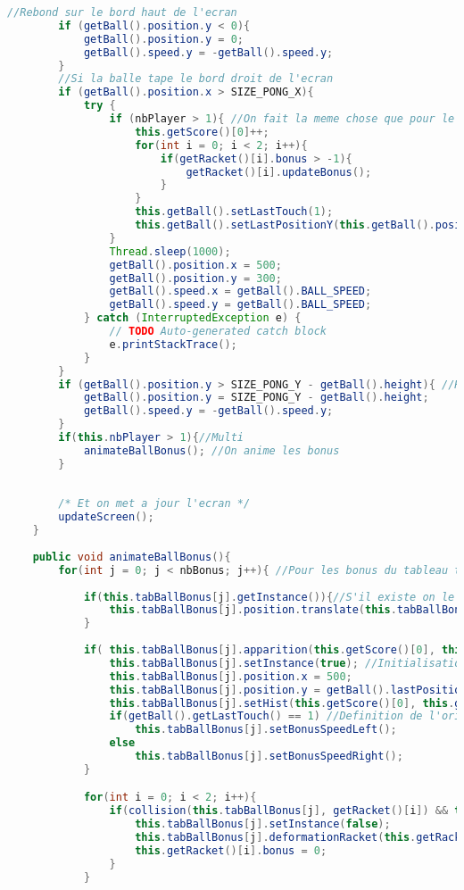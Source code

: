 \begin{lstlisting}[language=Java]
		//Rebond sur le bord haut de l'ecran
		if (getBall().position.y < 0){ 
			getBall().position.y = 0;
			getBall().speed.y = -getBall().speed.y;
		}
		//Si la balle tape le bord droit de l'ecran
		if (getBall().position.x > SIZE_PONG_X){ 
			try { 
				if (nbPlayer > 1){ //On fait la meme chose que pour le bord gauche
					this.getScore()[0]++;
					for(int i = 0; i < 2; i++){
						if(getRacket()[i].bonus > -1){
							getRacket()[i].updateBonus();
						}
					}
					this.getBall().setLastTouch(1);
					this.getBall().setLastPositionY(this.getBall().position.y);
				}
				Thread.sleep(1000);
				getBall().position.x = 500;
				getBall().position.y = 300;
				getBall().speed.x = getBall().BALL_SPEED;
				getBall().speed.y = getBall().BALL_SPEED;
			} catch (InterruptedException e) {
				// TODO Auto-generated catch block
				e.printStackTrace();
			}
		}
		if (getBall().position.y > SIZE_PONG_Y - getBall().height){ //Rebond sur le bas de l'ecran
			getBall().position.y = SIZE_PONG_Y - getBall().height;
			getBall().speed.y = -getBall().speed.y;
		}
		if(this.nbPlayer > 1){//Multi
			animateBallBonus(); //On anime les bonus
		}
		
		
		/* Et on met a jour l'ecran */
		updateScreen(); 
	}
	
	public void animateBallBonus(){
		for(int j = 0; j < nbBonus; j++){ //Pour les bonus du tableau tabBallBonus
			
			if(this.tabBallBonus[j].getInstance()){//S'il existe on le fait avancer
				this.tabBallBonus[j].position.translate(this.tabBallBonus[j].getBonusSpeed(), 0);
			}
			
			if( this.tabBallBonus[j].apparition(this.getScore()[0], this.getScore()[1]) && !this.tabBallBonus[j].getInstance() && !this.tabBallBonus[j].isHist(this.getScore()[0], this.getScore()[1])){ 
				this.tabBallBonus[j].setInstance(true); //Initialisation de la balle, si condition d'apparition (fonction) et si il n'en existe pas deja un et si le score n'as pas deja creer une balle
				this.tabBallBonus[j].position.x = 500;
				this.tabBallBonus[j].position.y = getBall().lastPositionY + this.tabBallBonus[j].getPositionY();
				this.tabBallBonus[j].setHist(this.getScore()[0], this.getScore()[1]);
				if(getBall().getLastTouch() == 1) //Definition de l'orientation de la ballBonus
					this.tabBallBonus[j].setBonusSpeedLeft();
				else
					this.tabBallBonus[j].setBonusSpeedRight();
			}

			for(int i = 0; i < 2; i++){
				if(collision(this.tabBallBonus[j], getRacket()[i]) && this.tabBallBonus[j].getInstance()){
					this.tabBallBonus[j].setInstance(false); 
					this.tabBallBonus[j].deformationRacket(this.getRacket()[i]);
					this.getRacket()[i].bonus = 0;
				}
			}


\end{lstlisting}
